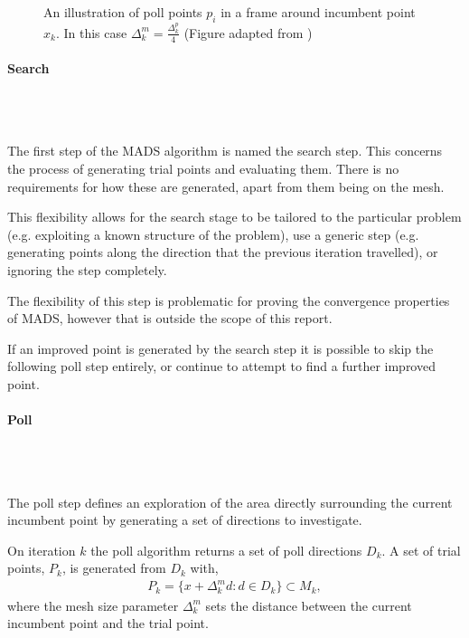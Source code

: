 \begin{figure}[thb]
    \centering
    
    \caption{An illustration of poll points $p_i$ in a frame around incumbent point $x_k$. In this case $\Delta^m_k = \frac{\Delta^p_k}{4}$ (Figure adapted from \cite{Audet2007MeshOptimization})}
    \label{fig:mesh}
\end{figure}

\paragraph{Search}\\\ \label{par:mads_search}

The first step of the \ac{MADS} algorithm is named the search step. This concerns the process of generating trial points and evaluating them. There is no requirements for how these are generated, apart from them being on the mesh. 

This flexibility allows for the search stage to be tailored to the particular problem (e.g. exploiting a known structure of the problem), use a generic step (e.g. generating points along the direction that the previous iteration travelled), or ignoring the step completely.

The flexibility of this step is problematic for proving the convergence properties of \ac{MADS}, however that is outside the scope of this report.

If an improved point is generated by the search step it is possible to skip the following poll step entirely, or continue to attempt to find a further improved point.

\paragraph{Poll} \\\

The poll step defines an exploration of the area directly surrounding the current incumbent point by generating a set of directions to investigate. 

On iteration $k$ the poll algorithm returns a set of poll directions $D_k$. A set of trial points, $P_k$, is generated from $D_k$ with,
\begin{gather}
    P_k = \big\{x + \Delta^m_kd : d\in D_k\big\} \subset M_k,\label{eqn:mads_poll_points}
\end{gather}
where the mesh size parameter $\Delta^m_k$ sets the distance between the current incumbent point and the trial point.

